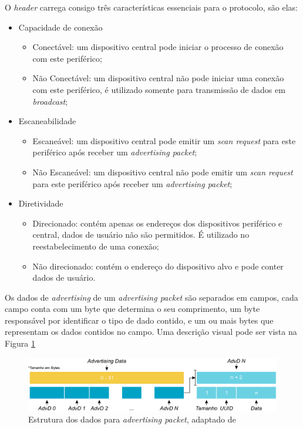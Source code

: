 \documentclass[a5paper]{ufsc-thesis}  %
\begin{document}
O \textit{header} carrega consigo três características essenciais para o protocolo, são elas:
\begin{itemize}
    \item Capacidade de conexão\begin{itemize}
        \item Conectável: um dispositivo central pode iniciar o processo de conexão com este periférico;
        \item Não Conectável: um dispositivo central não pode iniciar uma conexão com este periférico, é utilizado somente para transmissão de dados em \textit{broadcast};
    \end{itemize}
    
    \item Escaneabilidade\begin{itemize}
        \item Escaneável: um dispositivo central pode emitir um \textit{scan request} para este periférico após receber um \textit{advertising packet};
        \item Não Escaneável: um dispositivo central não pode emitir um \textit{scan request} para este periférico após receber um \textit{advertising packet};
    \end{itemize}

    \item Diretividade\begin{itemize}
        \item Direcionado: contém apenas os endereços dos dispositivos periférico e central, dados de usuário não são permitidos. É utilizado no reestabelecimento de uma conexão;
        \item Não direcionado: contém o endereço do dispositivo alvo e pode conter dados de usuário.
    \end{itemize}
\end{itemize}

Os dados de \textit{advertising} de um \textit{advertising packet} são separados em campos, cada campo conta com um byte que determina o seu comprimento, um byte responsável por identificar o tipo de dado contido, e um ou mais bytes que representam os dados contidos no campo. Uma descrição visual pode ser vista na Figura \ref{fig:ble_adv_data}

\begin{figure}[h]
    \centering
    \includegraphics[width=1\linewidth]{imagens/ble_adv_data.eps}
    \caption{Estrutura dos dados para \textit{advertising packet}, adaptado de \cite{nordic_semi_academy}}
    \label{fig:ble_adv_data}
\end{figure}
\end{document}
